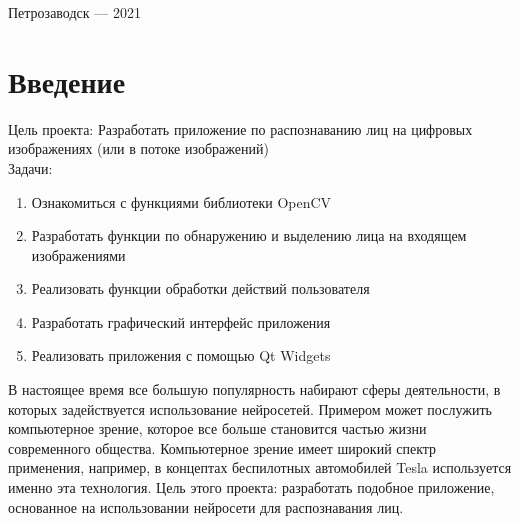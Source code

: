 \documentclass[a4paper,12pt]{article}
\begin{document}
\vfill

\begin{center}
\large
    Петрозаводск --- 2021
\end{center}

%
%                         

\newpage

%

\tableofcontents

% 

\newpage

%                          

%

\section*{Введение}

Цель проекта: Разработать приложение по распознаванию лиц на цифровых изображениях (или в потоке изображений) \\

Задачи:
\begin{enumerate}
\item Ознакомиться с функциями библиотеки OpenCV 
\item Разработать функции по обнаружению и выделению лица на входящем изображениями
\item Реализовать функции обработки действий пользователя
\item Разработать графический интерфейс приложения
\item Реализовать приложения с помощью Qt Widgets
\end{enumerate}

В настоящее время все большую популярность набирают сферы деятельности, в которых задействуется использование нейросетей. Примером может послужить компьютерное зрение, которое все больше становится частью жизни современного общества. Компьютерное зрение имеет широкий спектр применения, например, в концептах беспилотных автомобилей Tesla используется именно эта технология. Цель этого проекта: разработать подобное приложение, основанное на использовании нейросети для распознавания лиц.
\end{document}
